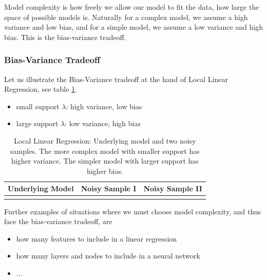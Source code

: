 Model complexity is how freely we allow our model to fit the data, how large the space of possible models is.
Naturally for a complex model, we assume a high variance and low bias, and for a simple model, we assume a low variance and high bias.
This is the \textcolor{blue1}{bias-variance tradeoff}.

\subsubsection{Bias-Variance Tradeoff}

Let us illustrate the Bias-Variance tradeoff at the hand of Local Linear Regression,
see table \ref{tab:bias_variance_llr}.

\begin{itemize}
    \item small support $\lambda$: high variance, low bias
    \item large support $\lambda$: low variance, high bias
\end{itemize}

\begin{table}[H]
    \centering
    \begin{tabular}{c|c|c}
        \textbf{Underlying Model} & \textbf{Noisy Sample I} & \textbf{Noisy Sample II} \\
        \hline
         &
         &
        
        \\
        \hline
    \end{tabular}
    \caption{Local Linear Regression: Underlying model and two noisy samples. The more complex model
    with smaller support has higher variance. The simpler model with larger support has higher bias.}
    \label{tab:bias_variance_llr}
\end{table}

Further examples of situations where we must choose model complexity, and thus face the bias-variance tradeoff,
are
\begin{itemize}
    \item how many features to include in a linear regression
    \item how many layers and nodes to include in a neural network
    \item ...
\end{itemize}

